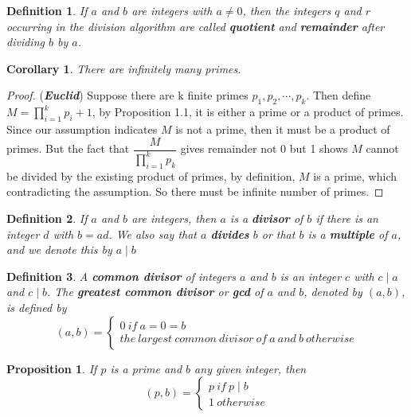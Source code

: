 \documentclass{article}
\newtheorem*{definition}{Definition}
\newtheorem{proposition}[theorem]{Proposition}
\newtheorem{corollary}[theorem]{Corollary}
\begin{document}
    \begin{definition}
        If \(a\) and \(b\) are integers with \(a \neq 0\), then the integers \(q\) and 
        \(r\) occurring in the division algorithm are called \textbf{quotient} and 
        \textbf{remainder} after dividing \(b\) by \(a\).
    \end{definition}
    \begin{corollary}
        There are infinitely many primes.
    \end{corollary}
    \begin{proof}
        (\textbf{\textit{Euclid}})  Suppose there are k finite primes \(p_1, p_2, \cdots, p_k\).
        Then define \(M=\prod_{i=1}^k p_i + 1\), by Proposition 1.1, it is either a 
        prime or a product of primes. Since our assumption indicates \(M\) is not a 
        prime, then it must be a product of primes. But the fact that \(\dfrac{M}{\prod_{i=1}^k p_k}\) 
        gives remainder not 0 but 1 shows \(M\) cannot be divided by the existing 
        product of primes, by definition, \(M\) is a prime, which contradicting the 
        assumption. So there must be infinite number of primes.
    \end{proof}
    \begin{definition}
        If \(a\) and \(b\) are integers, then \(a\) is a \textbf{divisor} of \(b\) if 
        there is an integer \(d\) with \(b=ad\). We also say that \(a\) \textbf{divides} 
        \(b\) or that \(b\) is a \textbf{multiple} of \(a\), and we denote this by \(a \mid b\)
    \end{definition}
    \begin{definition}
        A \textbf{common divisor} of integers \(a\) and \(b\) is an integer \(c\) with 
        \(c \mid a\) and \(c \mid b\). The \textbf{greatest common divisor} or \textbf{gcd} 
        of \(a\) and \(b\), denoted by \((a, b)\), is defined by 
        \begin{equation*}
            (a, b) = \begin{cases}
                0 \ if \  a=0=b\\
                the\ largest\ common\ divisor\ of\ a\ and\ b\ otherwise
            \end{cases}
        \end{equation*}
    \end{definition}
    \begin{proposition}
        If \(p\) is a prime and \(b\) any given integer, then 
        \[
            (p, b)=\begin{cases}
                p\ if\ p \mid b\\
                1\ otherwise
            \end{cases}  
        \]
    \end{proposition}
\end{document}
